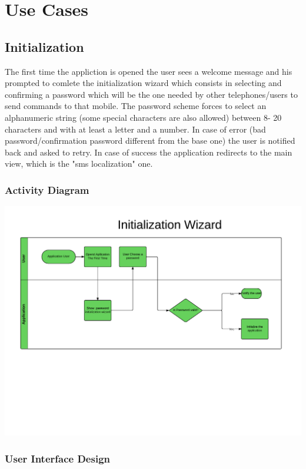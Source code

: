 \chapter{Use Cases}
\label{cap:UseCases} 


\section{Initialization}
The first time the appliction is opened the user sees a welcome message and his
prompted to comlete the initialization wizard which consists in selecting and
confirming a password which will be the one needed by other telephones/users
to send commands to that mobile. The password scheme forces to select an
alphanumeric string (some special characters are also allowed) between 8-
20 characters and with at least a letter and a number. In case of error
(bad password/confirmation password different from the base one) the user is
notified back and asked to retry. In case of success the application redirects
to the main view, which is the "sms localization" one.

\subsection{Activity Diagram}

\includegraphics[scale=0.5]{images/initialization_activity}

\newpage
\subsection{User Interface Design}

